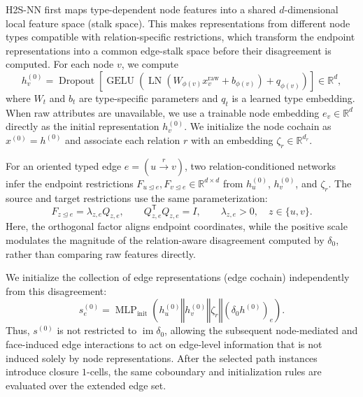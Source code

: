 \documentclass[sigconf,anonymous,review]{acmart}
\newcommand{\R}{\mathbb{R}}
\newcommand{\method}{\textsc{H2S-NN}}
\newcommand{\transpose}{\mathsf{T}}
\newcommand{\concat}{\mathbin\Vert}
\begin{document}
\method{} first maps type-dependent node features into a shared \(d\)-dimensional local feature space (stalk space). This makes representations from different node types compatible with relation-specific restrictions, which transform the endpoint representations into a common edge-stalk space before their disagreement is computed. For each node \(v\), we compute
\begin{equation}
  h_v^{(0)}
  =\operatorname{Dropout}\!\left[
    \operatorname{GELU}\!\left(
      \operatorname{LN}
      \left(W_{\phi(v)}x_v^{\mathrm{raw}}+b_{\phi(v)}\right)
      +q_{\phi(v)}
    \right)
  \right]\in\R^d ,
  \label{eq:node-encoder}
\end{equation}
where \(W_t\) and \(b_t\) are type-specific parameters and \(q_t\) is a learned type embedding. When raw attributes are unavailable, we use a trainable node embedding \(e_v\in\mathbb{R}^{d}\) directly as the initial representation \(h_v^{(0)}\). We initialize the node cochain as \(x^{(0)}=h^{(0)}\) and associate each relation \(r\) with an embedding \(\zeta_r\in\R^{d_r}\).

For an oriented typed edge \(e=(u\xrightarrow{r}v)\), two relation-conditioned networks infer the endpoint restrictions
\(F_{u\unlhd e},F_{v\unlhd e}\in\R^{d\times d}\) from
\(h_u^{(0)}\), \(h_v^{(0)}\), and \(\zeta_r\). The source and target restrictions use the same parameterization:
\begin{equation}
  F_{z\unlhd e}=\lambda_{z,e}Q_{z,e},
  \qquad
  Q_{z,e}^{\transpose}Q_{z,e}=I,
  \qquad
  \lambda_{z,e}>0,
  \quad z\in\{u,v\}.
  \label{eq:conformal-map}
\end{equation}
Here, the orthogonal factor aligns endpoint coordinates, while the positive scale modulates the magnitude of the relation-aware disagreement computed by \(\delta_0\), rather than comparing raw features directly.

We initialize the collection of edge representations (edge cochain) independently from this disagreement:
\begin{equation}
  s_e^{(0)}
  =\operatorname{MLP}_{\mathrm{init}}\!\left(
    h_u^{(0)}\concat h_v^{(0)}\concat \zeta_r
    \concat(\delta_0h^{(0)})_e
  \right).
  \label{eq:edge-init}
\end{equation}
Thus, \(s^{(0)}\) is not restricted to \(\operatorname{im}\delta_0\), allowing the subsequent node-mediated and face-induced edge interactions to act on edge-level information that is not induced solely by node representations. After the selected path instances introduce closure \(1\)-cells, the same coboundary and initialization rules are evaluated over the extended edge set.
\end{document}

